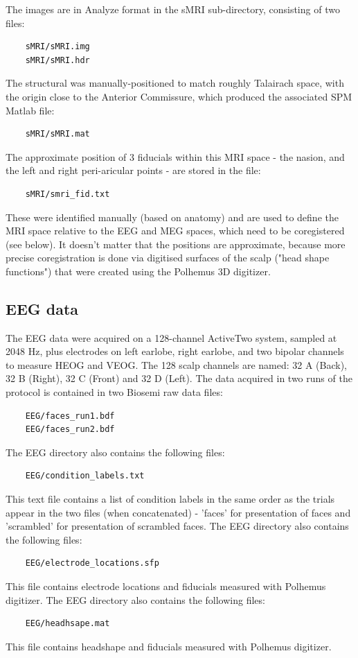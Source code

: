 The images are in Analyze format in the sMRI sub-directory, consisting of two files:
\begin{verbatim}
    sMRI/sMRI.img
    sMRI/sMRI.hdr
\end{verbatim}
The structural was manually-positioned to match roughly Talairach space, with the origin close to the Anterior Commissure, which produced the associated SPM Matlab file:
\begin{verbatim}
    sMRI/sMRI.mat
\end{verbatim}
The approximate position of 3 fiducials within this MRI space - the nasion, and the left and right peri-aricular points - are stored in the file:
\begin{verbatim}
    sMRI/smri_fid.txt
\end{verbatim}
These were identified manually (based on anatomy) and are used to define the MRI space relative to the EEG and MEG spaces, which need to be coregistered (see below). It doesn't matter that the positions are approximate, because more precise coregistration is done via digitised surfaces of the scalp ("head shape functions") that were created using the Polhemus 3D digitizer.

\subsection{EEG data}

The EEG data were acquired on a 128-channel ActiveTwo system, sampled at 2048 Hz, plus electrodes on left earlobe, right earlobe, and two bipolar channels to measure HEOG and VEOG. The 128 scalp channels are named: 32 A (Back), 32 B (Right), 32 C (Front) and 32 D (Left). The data acquired in two runs of the protocol is contained in two Biosemi raw data files:
\begin{verbatim}
    EEG/faces_run1.bdf
    EEG/faces_run2.bdf
\end{verbatim}

The EEG directory also contains the following files:
\begin{verbatim}
    EEG/condition_labels.txt
\end{verbatim}
This text file contains a list of condition labels in the same order as the trials appear in the two files (when concatenated) - 'faces' for presentation of faces and 'scrambled' for presentation of scrambled faces. 
The EEG directory also contains the following files:
\begin{verbatim}
    EEG/electrode_locations.sfp
\end{verbatim}
This file contains electrode locations and fiducials measured with Polhemus digitizer.
The EEG directory also contains the following files:
\begin{verbatim}
    EEG/headhsape.mat
\end{verbatim}
This file contains headshape and fiducials measured with Polhemus digitizer.

